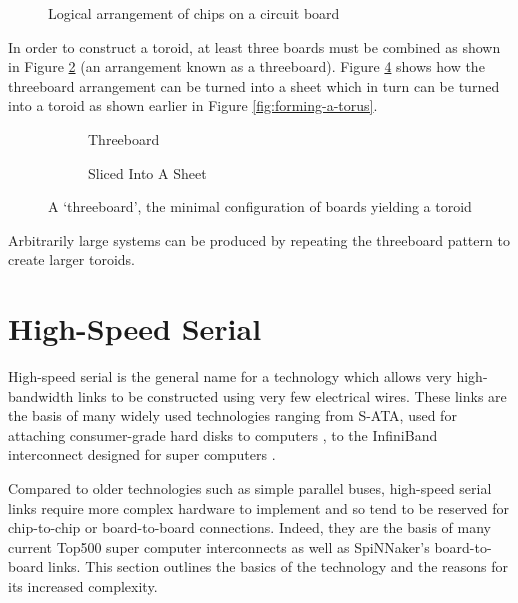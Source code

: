 			\begin{figure}
				\center
				
				\caption{Logical arrangement of chips on a circuit board}
				\label{fig:chipsOnBoard}
			\end{figure}
			
			In order to construct a toroid, at least three boards must be combined as
			shown in Figure \ref{fig:threeboard} (an arrangement known as a
			threeboard).  Figure \ref{fig:threeboardSliced} shows how the threeboard
			arrangement can be turned into a sheet which in turn can be turned into a
			toroid as shown earlier in Figure \ref{fig:forming-a-torus}.
			
			\begin{figure}
				\begin{subfigure}[b]{0.45\textwidth}
					\center
					
					\caption{Threeboard}
					\label{fig:threeboard}
				\end{subfigure}
				\begin{subfigure}[b]{0.45\textwidth}
					\center
					
					\caption{Sliced Into A Sheet}
					\label{fig:threeboardSliced}
				\end{subfigure}
				
				\caption[A `threeboard']{A `threeboard', the minimal configuration of
				boards yielding a toroid}
			\end{figure}
			
			Arbitrarily large systems can be produced by repeating the threeboard
			pattern to create larger toroids.
	
	\section{High-Speed Serial}
		
		\label{sec:high-speed-serial}
		
		
		High-speed serial is the general name for a technology which allows very
		high-bandwidth links to be constructed using very few electrical wires.
		These links are the basis of many widely used technologies ranging from
		S-ATA, used for attaching consumer-grade hard disks to computers
		\cite{sataio}, to the InfiniBand interconnect designed for super computers
		\cite{infinibandta}.
		
		Compared to older technologies such as simple parallel buses, high-speed
		serial links require more complex hardware to implement and so tend to be
		reserved for chip-to-chip or board-to-board connections. Indeed, they are
		the basis of many current Top500 super computer interconnects as well as
		SpiNNaker's board-to-board links. This section outlines the basics of the
		technology and the reasons for its increased complexity.
		
